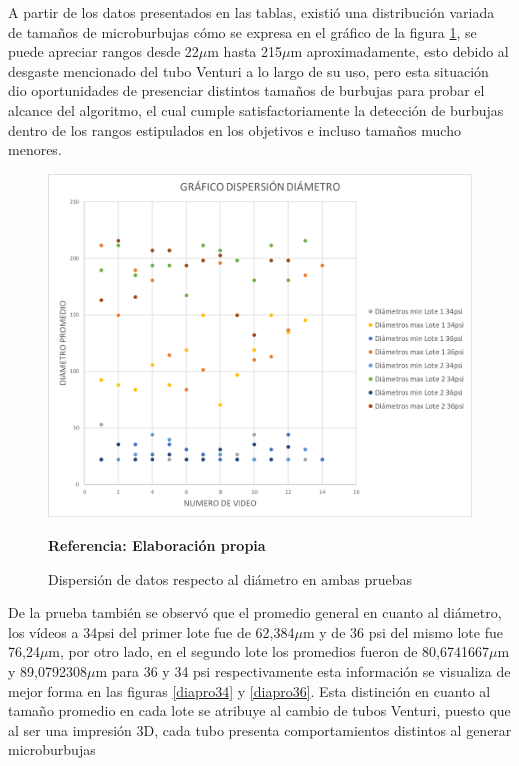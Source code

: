 \documentclass[12pt,twocolumn,a4paper]{article}
\begin{document}
A partir de los datos presentados en las tablas, existió una distribución variada de tamaños de microburbujas cómo se expresa en el gráfico de la figura \ref{dispdia}, se puede apreciar rangos desde  22$\mu$m hasta 215$\mu$m aproximadamente, esto debido al desgaste mencionado del tubo Venturi a lo largo de su uso, pero esta situación dio oportunidades de presenciar distintos tamaños de burbujas para probar el alcance del algoritmo, el cual cumple satisfactoriamente la detección de burbujas dentro de los rangos estipulados en los objetivos e incluso tamaños mucho menores.

\begin{figure}[h!]
	\centering
	\includegraphics[scale=0.35]{dispDia.png}
	\caption{Dispersión de datos respecto al diámetro en ambas pruebas} \textbf{Referencia: Elaboración propia} 
	\label{dispdia}
\end{figure}
 
De la prueba también se observó que el promedio general en cuanto al  diámetro, los vídeos a 34psi del primer lote fue de 62,384$\mu$m y de 36 psi del mismo lote fue 76,24$\mu$m, por otro lado, en el segundo lote los promedios fueron de 80,6741667$\mu$m y 89,0792308$\mu$m para 36 y 34 psi respectivamente esta información se visualiza de mejor forma en las figuras \ref{diapro34} y \ref{diapro36}. Esta distinción en cuanto al tamaño promedio en cada lote se atribuye al cambio de tubos Venturi, puesto que al ser una impresión 3D, cada tubo presenta comportamientos distintos al generar microburbujas
\end{document}
